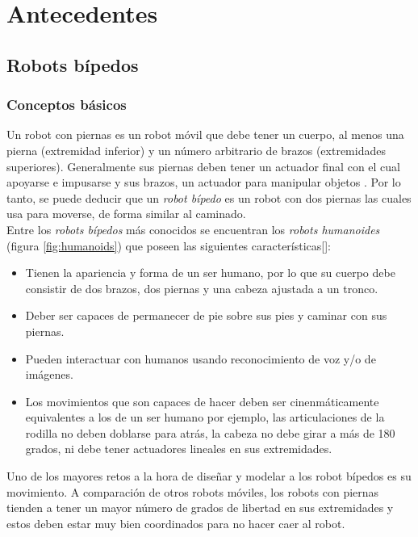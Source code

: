 \chapter{Antecedentes}
	\section{Robots bípedos}
		\subsection*{Conceptos básicos}
Un robot con piernas es un robot móvil que debe tener un cuerpo, al menos una pierna (extremidad inferior) y un número arbitrario de brazos (extremidades superiores). Generalmente sus piernas deben tener un actuador final con el cual apoyarse e impusarse  y sus brazos, un actuador para manipular objetos \citep{siciliano2016springer}. Por lo tanto, se puede deducir que un \textit{robot bípedo} es un robot con dos piernas las cuales usa para moverse, de forma similar al caminado.
\\

Entre los \textit{robots bípedos} más conocidos se encuentran los \textit{robots humanoides} (figura \ref{fig:humanoids}) que poseen las siguientes características[]:

\begin{itemize}
\item Tienen la apariencia y forma de un ser humano, por lo que su cuerpo debe consistir de dos brazos, dos piernas y una cabeza ajustada a un tronco.
\item Deber ser capaces de permanecer de pie sobre sus pies y caminar con sus piernas.
\item Pueden interactuar con humanos usando reconocimiento de voz y/o de imágenes.
\item Los movimientos que son capaces de hacer deben ser cinenmáticamente equivalentes a los de un ser humano por ejemplo, las articulaciones de la rodilla no deben doblarse para atrás, la cabeza no debe girar a más de 180 grados, ni debe tener actuadores lineales en sus extremidades.
\end{itemize}

Uno de los mayores retos a la hora de diseñar y modelar a los robot bípedos es su movimiento. A comparación de otros robots móviles, los robots con piernas tienden a tener un mayor número de grados de libertad en sus extremidades y estos deben estar muy bien coordinados para no hacer caer al robot. 
\\
